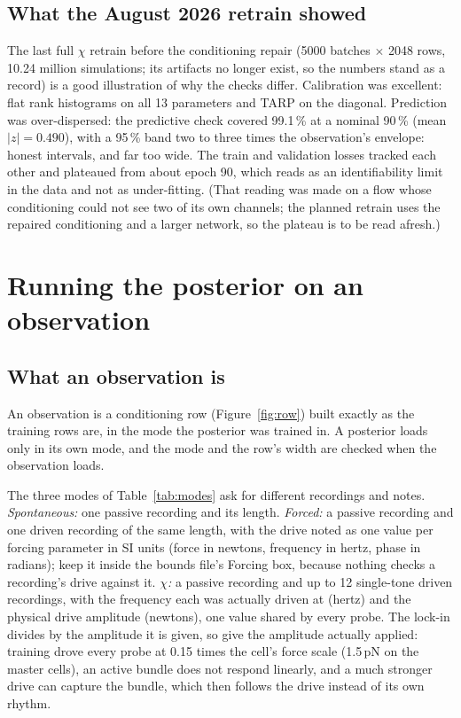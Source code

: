 \documentclass[10pt,a4paper]{article}
\begin{document}
\subsection{What the August 2026 retrain showed}

The last full $\chi$ retrain before the conditioning repair (5000 batches $\times$ 2048 rows, 10.24 million simulations; its
artifacts no longer exist, so the numbers stand as a record) is a good illustration of why the checks differ.
Calibration was excellent: flat rank histograms on all 13 parameters and TARP on the diagonal. Prediction was
over-dispersed: the predictive check covered 99.1\,\% at a nominal 90\,\% (mean $|z|=0.490$), with a 95\,\% band two to three
times the observation's envelope: honest intervals, and far too wide. The train and validation losses tracked each other and
plateaued from about epoch 90, which reads as an identifiability limit in the data and not as under-fitting. (That
reading was made on a flow whose conditioning could not see two of its own channels; the planned retrain uses the repaired
conditioning and a larger network, so the plateau is to be read afresh.)

\section{Running the posterior on an observation}\label{sec:infer}

\subsection{What an observation is}

An observation is a conditioning row (Figure~\ref{fig:row}) built exactly as the training rows are, in the mode the
posterior was trained in. A posterior loads only in its own mode, and the mode and the row's width are checked when the
observation loads.

The three modes of Table~\ref{tab:modes} ask for different recordings and notes.
\emph{Spontaneous:} one passive recording and its length.
\emph{Forced:} a passive recording and one driven recording of the same length, with the drive noted as one value per
forcing parameter in SI units (force in newtons, frequency in hertz, phase in radians); keep it inside the bounds file's
Forcing box, because nothing checks a recording's drive against it.
\emph{$\chi$:} a passive recording and up to 12 single-tone driven recordings, with the frequency each was actually driven at
(hertz) and the physical drive amplitude (newtons), one value shared by every probe. The lock-in divides by the amplitude
it is given, so give the amplitude actually applied: training drove every probe at 0.15 times the cell's force scale
(1.5\,pN on the master cells), an active bundle does not respond linearly, and a much stronger drive can capture the
bundle, which then follows the drive instead of its own rhythm.
\end{document}
